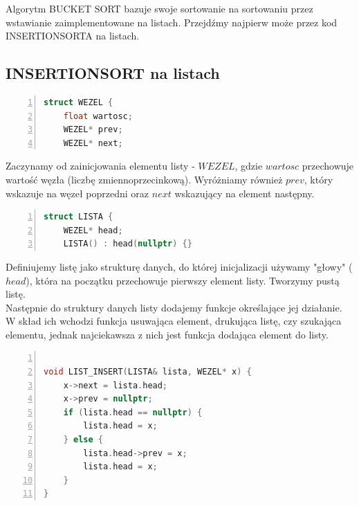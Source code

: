\documentclass{article}
\begin{document}
\large{Algorytm BUCKET SORT bazuje swoje sortowanie na sortowaniu przez wstawianie zaimplementowane na listach. Przejdźmy najpierw może przez kod INSERTIONSORTA na listach.}
\newpage
\subsection{INSERTIONSORT na listach}

\begin{lstlisting}[language=C++, caption={Kod funkcji sortowania przez wstawianie na listach}, numbers=left, frame=single, xleftmargin=20pt]
struct WEZEL {
	float wartosc;
	WEZEL* prev;
	WEZEL* next;
\end{lstlisting}

\large{Zaczynamy od zainicjowania elementu listy - $WEZEL$, gdzie $wartosc$ przechowuje wartość węzła (liczbę zmiennoprzecinkową). Wyróżniamy również $prev$, który wskazuje na węzeł poprzedni oraz $next$ wskazujący na element następny.}

\begin{lstlisting}[language=C++, caption={Kod funkcji sortowania przez wstawianie na listach}, numbers=left, frame=single, xleftmargin=20pt]
struct LISTA {
	WEZEL* head;
	LISTA() : head(nullptr) {}
\end{lstlisting}

\large{Definiujemy listę jako strukturę danych, do której inicjalizacji używamy "głowy" ($head$), która na początku przechowuje pierwszy element listy. Tworzymy pustą listę.}
\\

\large{Następnie do struktury danych listy dodajemy funkcje określające jej działanie. W skład ich wchodzi funkcja usuwająca element, drukująca listę, czy szukająca elementu, jednak najciekawsza z nich jest funkcja dodająca element do listy.}

\begin{lstlisting}[language=C++, caption={Kod funkcji sortowania przez wstawianie na listach}, numbers=left, frame=single, xleftmargin=20pt]

void LIST_INSERT(LISTA& lista, WEZEL* x) {
	x->next = lista.head;
	x->prev = nullptr;
	if (lista.head == nullptr) {
		lista.head = x;
	} else {
		lista.head->prev = x;
		lista.head = x;
	}
}
\end{lstlisting}
\end{document}

